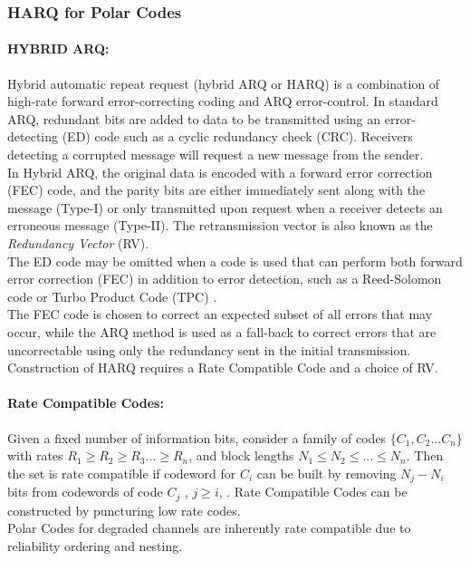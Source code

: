 \documentclass[
11pt, %
a4paper, %
oneside, %
headinclude,footinclude, %
BCOR5mm, %
]{scrartcl}
\begin{document}
\subsubsection{HARQ for Polar Codes}
\paragraph{HYBRID ARQ:}Hybrid automatic repeat request (hybrid ARQ or HARQ) is a combination of high-rate forward error-correcting coding and ARQ error-control. In standard ARQ, redundant bits are added to data to be transmitted using an error-detecting (ED) code such as a cyclic redundancy check (CRC). Receivers detecting a corrupted message will request a new message from the sender. \\In Hybrid ARQ, the original data is encoded with a forward error correction (FEC) code, and the parity bits are either immediately sent along with the message (Type-I) or only transmitted upon request when a receiver detects an erroneous message (Type-II). The retransmission vector is also known as the \emph{Redundancy Vector} (RV). \\The ED code may be omitted when a code is used that can perform both forward error correction (FEC) in addition to error detection, such as a Reed-Solomon code or  Turbo Product Code (TPC) \cite{harqmukhtar}.\\The FEC code is chosen to correct an expected subset of all errors that may occur, while the ARQ method is used as a fall-back to correct errors that are uncorrectable using only the redundancy sent in the initial transmission.\\Construction of HARQ requires a Rate Compatible Code and a choice of RV.
\paragraph{Rate Compatible Codes:}
Given a fixed number of information bits, consider a family of codes $\{C_1,C_2...C_n\}$  with rates $R_1\geq R_2\geq R_3...\geq R_n$, and block lengths $N_1 \leq N_2 \leq ... \leq N_n$.
Then the set is rate compatible if codeword for $C_i$ can be built by removing $N_j-N_i$ bits from codewords of code $C_j$ , $j\geq i$, \cite{mondelli}. Rate Compatible Codes can be constructed by puncturing low rate codes. 
\\Polar Codes for degraded channels are inherently rate compatible due to reliability ordering and nesting.
\end{document}
